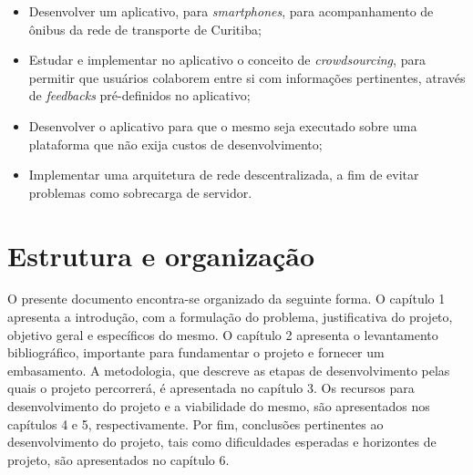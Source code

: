 \begin{itemize}
\item Desenvolver um aplicativo, para \textit{smartphones}, para acompanhamento de ônibus da rede de transporte de Curitiba;
\item Estudar e implementar no aplicativo o conceito de \textit{crowdsourcing}, para permitir que usuários colaborem entre si com informações pertinentes, através de \textit{feedbacks} pré-definidos no aplicativo;
\item Desenvolver o aplicativo para que o mesmo seja executado sobre uma plataforma que não exija custos de desenvolvimento;
\item Implementar uma arquitetura de rede descentralizada, a fim de evitar problemas como sobrecarga de servidor.
\end{itemize}

\section{Estrutura e organização}

O presente documento encontra-se organizado da seguinte forma. O capítulo 1 apresenta a introdução, com a formulação do problema, justificativa do projeto, objetivo geral e específicos do mesmo. O capítulo 2 apresenta o levantamento bibliográfico, importante para fundamentar o projeto e fornecer um embasamento. A metodologia, que descreve as etapas de desenvolvimento pelas quais o projeto percorrerá, é apresentada no capítulo 3. Os recursos para desenvolvimento do projeto e a viabilidade do mesmo, são apresentados nos capítulos 4 e 5, respectivamente. Por fim, conclusões pertinentes ao desenvolvimento do projeto, tais como dificuldades esperadas e horizontes de projeto, são apresentados no capítulo 6.
